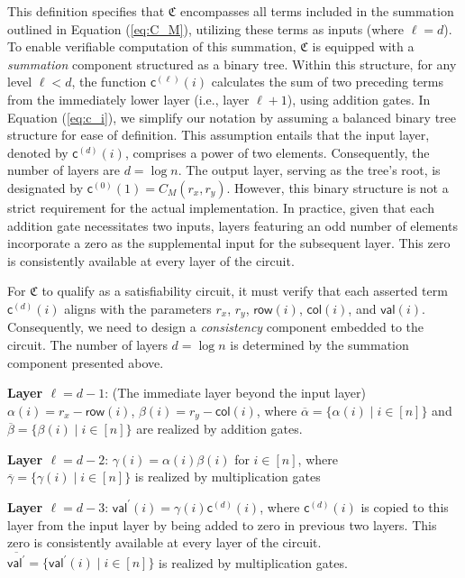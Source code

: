 This definition specifies that $\mathfrak{C}$ encompasses all terms included in the summation outlined in Equation (\ref{eq:C_M}), utilizing these terms as inputs (where $\ell = d$). To enable verifiable computation of this summation, $\mathfrak{C}$ is equipped with a \textit{summation} component structured as a binary tree. Within this structure, for any level $\ell < d$, the function $\mathsf{c}^{(\ell)}(i)$ calculates the sum of two preceding terms from the immediately lower layer (i.e.,  layer $\ell+1$), using addition gates. In Equation (\ref{eq:c_i}), we simplify our notation by assuming a balanced binary tree structure for ease of definition. This assumption entails that the input layer, denoted by $\mathsf{c}^{(d)}(i)$, comprises a power of two elements. Consequently, the number of layers are $d = \log{n}$. The output layer, serving as the tree's root, is designated by $\mathsf{c}^{(0)}(1) = C_M(r_x, r_y)$. However, this binary structure is not a strict requirement for the actual implementation. In practice, given that each addition gate necessitates two inputs, layers featuring an odd number of elements incorporate a zero as the supplemental input for the subsequent layer. This zero is consistently available at every layer of the circuit.


For $\mathfrak{C}$ to qualify as a satisfiability circuit, it must verify that each asserted term $\mathsf{c}^{(d)}(i)$ aligns with the parameters $r_x$, $r_y$, $\mathsf{row}(i)$, $\mathsf{col}(i)$, and $\mathsf{val}(i)$. Consequently, we need to design a \textit{consistency} component embedded to the circuit. The number of layers $d = \log{n}$ is determined by the summation component presented above. 

\noindent\textbf{Layer  $\ell = d-1$}: (The immediate layer beyond the input layer) $\alpha(i) = r_x - \mathsf{row}(i)$, $\beta(i) = r_y - \mathsf{col}(i)$, where $\overline{\alpha}=\{\alpha(i) \mid i \in [n]\}$ and $\overline{\beta}=\{\beta(i) \mid i \in [n]\}$ are realized by addition gates.

\noindent\textbf{Layer  $\ell = d-2$}: $\gamma(i) = \alpha(i)\beta(i)$ for $i \in [n]$, where $\overline{\gamma}=\{\gamma(i) \mid i \in [n]\}$ is realized by multiplication gates

\noindent\textbf{Layer  $\ell = d-3$}: $\mathsf{val}^\prime(i) = \gamma(i)\mathsf{c}^{(d)}(i)$, where $\mathsf{c}^{(d)}(i)$ is  copied to this layer from the input layer by being added to zero in previous two layers. This zero is consistently available at every layer of the circuit. $\overline{\mathsf{val}^\prime}=\{\mathsf{val}^\prime(i) \mid i \in [n]\}$ is realized by multiplication gates.

